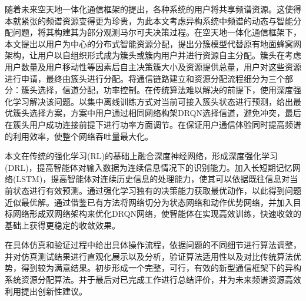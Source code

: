 \begin{cabstract}

随着未来空天地一体化通信框架的提出，各种系统的用户将共享频谱资源。这使得本就紧张的频谱资源变得更为珍贵，为此本文考虑异构系统中频谱的动态与智能分配问题，将其构建其为部分观测马尔可夫决策过程。在空天地一体化通信框架下，本文提出以用户为中心的分布式智能资源分配，提出分簇模型代替原有地面蜂窝网架构，让用户以自组织形式成为簇头或簇内用户并进行资源自主分配。簇头在考虑用户数量及用户移动性等因素后自主决策簇大小及资源提供总量，用户对这些资源进行申请，最终由簇头进行分配。将通信链路建立和资源分配流程细分为三个部分：簇头选择，信道分配，功率控制。在传统算法难以解决的前提下，使用深度强化学习解决该问题。以集中离线训练方式对当前可接入簇头状态进行预测，给出最优簇头选择方案，方案中用户通过相同网络构架DRQN选择信道，避免冲突，最后在簇头用户成功连接前提下进行功率方面调节。在保证用户通信体验同时提高频谱的利用效率，使整个网络吞吐量最大化。

本文在传统的强化学习(RL)的基础上融合深度神经网络，形成深度强化学习(DRL)，提高智能体对输入数据为连续信息情况下的识别能力。加入长短期记忆网络(LSTM)，提高智能体对连续历史信息的处理能力，使其可以依据既往信息对当前状态进行有效预测。通过强化学习独有的决策能力获取最优动作，以此得到问题近似最优解。通过借鉴已有方法将网络切分为状态网络和动作优势网络，并加入目标网络形成双网络架构来优化DRQN网络，使智能体在实现高效训练，快速收敛的基础上获得更稳定的收敛效果。

在具体仿真和验证过程中给出具体操作流程，依据问题的不同细节进行算法调整，并对仿真测试结果进行直观化展示以及分析，验证算法适用性以及对比传统算法优势，得到较为满意结果。初步形成一个完整，可行，有效的新型通信框架下的异构系统资源分配算法。并于最后对已完成工作进行总结评价，并为未来频谱资源高效利用提出创新性建议。

\end{cabstract}

